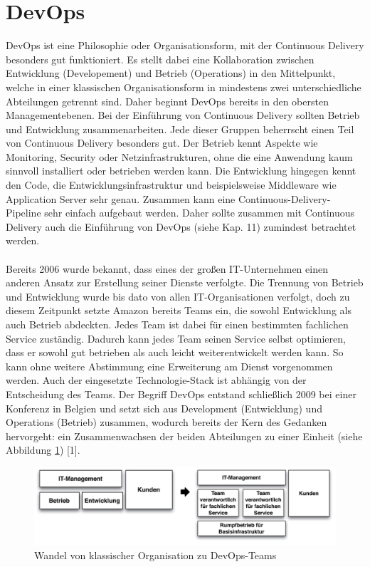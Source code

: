 \section{DevOps}
DevOps ist eine Philosophie oder Organisationsform, mit der Continuous Delivery besonders gut funktioniert. Es stellt dabei eine Kollaboration zwischen Entwicklung (Developement) und Betrieb (Operations) in den Mittelpunkt, welche in einer klassischen Organisationsform in mindestens zwei unterschiedliche Abteilungen getrennt sind. Daher beginnt DevOps bereits in den obersten Managementebenen. 
Bei der Einführung von Continuous Delivery sollten Betrieb und Entwicklung zusammenarbeiten. Jede dieser Gruppen beherrscht einen Teil von Continuous Delivery besonders gut. Der Betrieb kennt Aspekte wie Monitoring, Security oder Netzinfrastrukturen, ohne die eine Anwendung kaum sinnvoll installiert oder betrieben werden kann. Die Entwicklung hingegen kennt den Code, die Entwicklungsinfrastruktur und beispielsweise Middleware wie Application Server sehr genau. Zusammen kann eine Continuous-Delivery-Pipeline sehr einfach aufgebaut werden. Daher sollte zusammen mit Continuous Delivery auch die Einführung von DevOps (siehe Kap. 11) zumindest betrachtet werden.\\ \\
Bereits 2006 wurde bekannt, dass eines der großen IT-Unternehmen einen anderen Ansatz zur Erstellung seiner Dienste verfolgte. Die Trennung von Betrieb und Entwicklung wurde bis dato von allen IT-Organisationen verfolgt, doch zu diesem Zeitpunkt setzte Amazon bereits Teams ein, die sowohl Entwicklung als auch Betrieb abdeckten. Jedes Team ist dabei für einen bestimmten fachlichen Service zuständig. Dadurch kann jedes Team seinen Service selbst optimieren, dass er sowohl gut betrieben als auch leicht weiterentwickelt werden kann. So kann ohne weitere Abstimmung eine Erweiterung am Dienst vorgenommen werden. Auch der eingesetzte Technologie-Stack ist abhängig von der Entscheidung des Teams. Der Begriff DevOps entstand schließlich 2009 bei einer Konferenz in Belgien und setzt sich aus Development (Entwicklung) und Operations (Betrieb) zusammen, wodurch bereits der Kern des Gedanken hervorgeht: ein Zusammenwachsen der beiden Abteilungen zu einer Einheit (siehe Abbildung \ref{fig:devops}) [1]. \\
\begin{figure}[h!]
	\centering
	\includegraphics[width=0.8\linewidth]{images/devops}
	\caption{Wandel von klassischer Organisation zu DevOps-Teams} %
	\label{fig:devops}
\end{figure}
